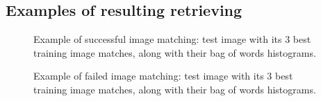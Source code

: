 \documentclass[11pt,a4paper]{article}
\begin{document}
\subsection{Examples of resulting retrieving}

\begin{figure}[H]
\centering
{}
\label{fig:results_11}
\caption{Example of successful image matching: test image with its 3 best
    training image matches, along with their bag of words histograms.}
\end{figure}
%
\begin{figure}[H]
\centering
{}
\label{fig:results_18}
\caption{Example of failed image matching: test image with its 3 best training
    image matches, along with their bag of words histograms.}
\end{figure}
%
\end{document}
